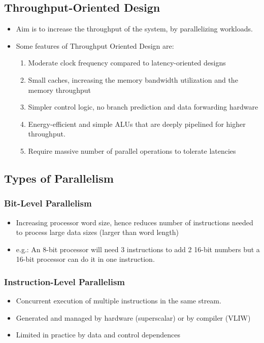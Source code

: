 \documentclass{article}
\begin{document}
\subsection{Throughput-Oriented Design}
\begin{itemize}
    \item Aim is to increase the throughput of the system, by parallelizing workloads.
        
    \item Some features of Throughput Oriented Design are:
    \begin{enumerate}
        \item Moderate clock frequency compared to latency-oriented designs
            
        \item Small caches, increasing the memory bandwidth utilization and the memory throughput
            
        \item Simpler control logic, no branch prediction and data forwarding hardware
            
        \item Energy-efficient and simple ALUs that are deeply pipelined for higher throughput.
            
        \item Require massive number of parallel operations to tolerate latencies
    \end{enumerate}
\end{itemize}

\subsection{Types of Parallelism}

\subsubsection{Bit-Level Parallelism}
\begin{itemize}
    \item Increasing processor word size, hence reduces number of instructions needed to process large data sizes (larger than word length)
    
    \item e.g.: An 8-bit processor will need 3 instructions to add 2 16-bit numbers but a 16-bit processor can do it in one instruction. 
\end{itemize}

\subsubsection{Instruction-Level Parallelism}
\begin{itemize}
    \item Concurrent execution of multiple instructions in the same stream. 
    
    \item Generated and managed by hardware (superscalar) or by compiler (VLIW)
    
    \item Limited in practice by data and control dependences
\end{itemize}
\end{document}
